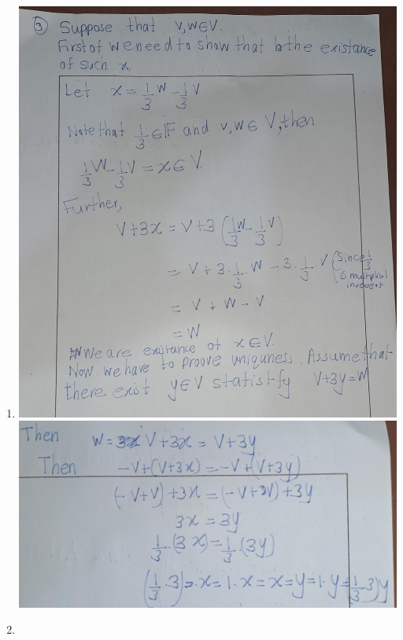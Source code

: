 \documentclass[
]{book}
\theoremstyle{definition}
\theoremstyle{definition}
\theoremstyle{definition}
\theoremstyle{definition}
\theoremstyle{remark}
\begin{document}
\begin{enumerate}
\def\labelenumi{\arabic{enumi}.}
\setcounter{enumi}{2}
\item
  \includegraphics{fig/Ex1B/Ex3-1.jpg}
  \includegraphics{fig/Ex1B/Ex3-2.jpg}
\item
\end{enumerate}
\end{document}
